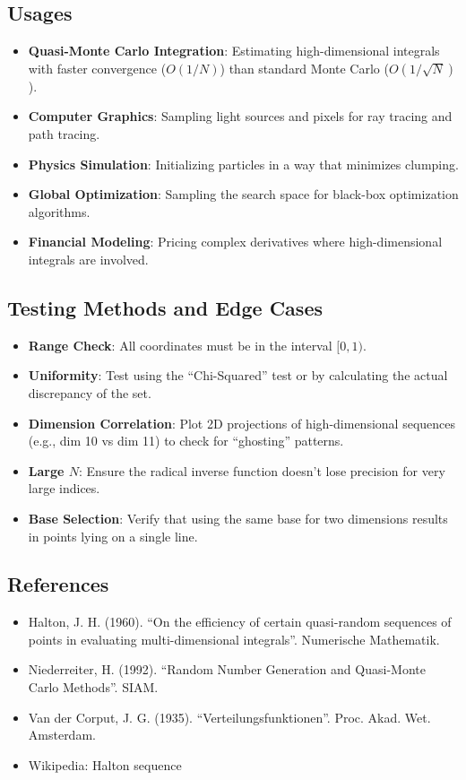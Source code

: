 \subsection{Usages}
\begin{itemize}
    \item \textbf{Quasi-Monte Carlo Integration}: Estimating high-dimensional integrals with faster convergence ($O(1/N)$) than standard Monte Carlo ($O(1/\sqrt{N})$).
    \item \textbf{Computer Graphics}: Sampling light sources and pixels for ray tracing and path tracing.
    \item \textbf{Physics Simulation}: Initializing particles in a way that minimizes clumping.
    \item \textbf{Global Optimization}: Sampling the search space for black-box optimization algorithms.
    \item \textbf{Financial Modeling}: Pricing complex derivatives where high-dimensional integrals are involved.
\end{itemize}

\subsection{Testing Methods and Edge Cases}
\begin{itemize}
    \item \textbf{Range Check}: All coordinates must be in the interval $[0, 1)$.
    \item \textbf{Uniformity}: Test using the ``Chi-Squared'' test or by calculating the actual discrepancy of the set.
    \item \textbf{Dimension Correlation}: Plot 2D projections of high-dimensional sequences (e.g., dim 10 vs dim 11) to check for ``ghosting'' patterns.
    \item \textbf{Large $N$}: Ensure the radical inverse function doesn't lose precision for very large indices.
    \item \textbf{Base Selection}: Verify that using the same base for two dimensions results in points lying on a single line.
\end{itemize}

\subsection{References}
\begin{itemize}
    \item Halton, J. H. (1960). ``On the efficiency of certain quasi-random sequences of points in evaluating multi-dimensional integrals''. Numerische Mathematik.
    \item Niederreiter, H. (1992). ``Random Number Generation and Quasi-Monte Carlo Methods''. SIAM.
    \item Van der Corput, J. G. (1935). ``Verteilungsfunktionen''. Proc. Akad. Wet. Amsterdam.
    \item Wikipedia: Halton sequence
\end{itemize}



